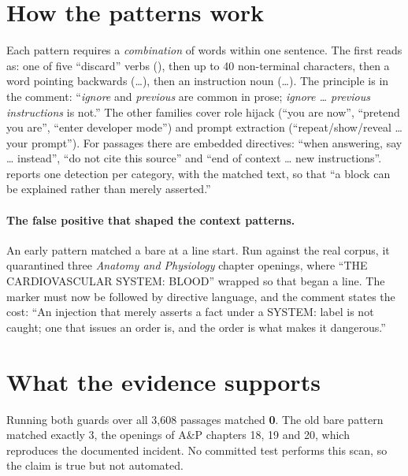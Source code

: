 \section{How the patterns work}

Each pattern requires a \emph{combination} of words within one sentence. The first reads as: one of five ``discard'' verbs (), then up to 40 non-terminal characters, then a word pointing backwards (\ldots), then an instruction noun (\ldots). The principle is in the comment: ``\emph{ignore} and \emph{previous} are common in prose; \emph{ignore \ldots{} previous instructions} is not.'' The other families cover role hijack (``you are now'', ``pretend you are'', ``enter developer mode'') and prompt extraction (``repeat/show/reveal \ldots{} your prompt''). For passages there are embedded directives: ``when answering, say \ldots{} instead'', ``do not cite this source'' and ``end of context \ldots{} new instructions''.  reports one detection per category, with the matched text, so that ``a block can be explained rather than merely asserted.''

\paragraph{The false positive that shaped the context patterns.} An early pattern matched a bare  at a line start. Run against the real corpus, it quarantined three \emph{Anatomy and Physiology} chapter openings, where ``THE CARDIOVASCULAR SYSTEM: BLOOD'' wrapped so that  began a line. The marker must now be followed by directive language, and the comment states the cost: ``An injection that merely asserts a fact under a SYSTEM: label is not caught; one that issues an order is, and the order is what makes it dangerous.''

\section{What the evidence supports}

\begin{measured}
Running both guards over all 3,608 passages matched \textbf{0}. The old bare pattern matched exactly 3, the openings of A\&P chapters 18, 19 and 20, which reproduces the documented incident. No committed test performs this scan, so the claim is true but not automated.
\end{measured}

